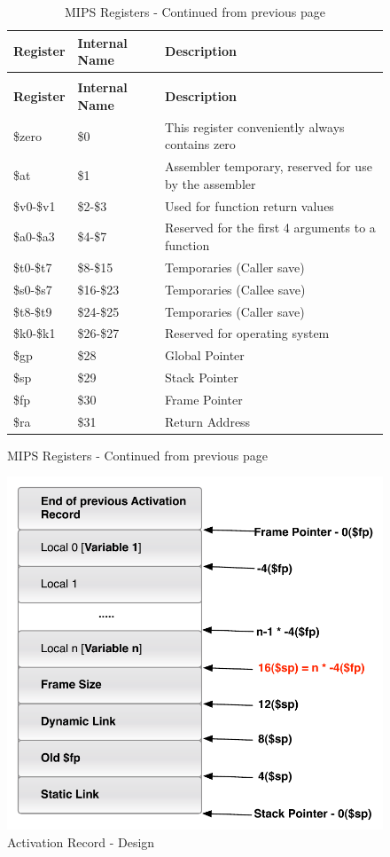 \begin{figure}[p]
	\begin{longtable}{|p{3cm}|p{3cm}|p{9cm}|}
		\caption[]{MIPS Registers \label{table:registers}}\\	
		\hline \textbf{Register} & \textbf{Internal Name} & \textbf{Description} \\ \hline
		\endfirsthead
		\caption[]{MIPS Registers - Continued from previous page}\\	
		\hline \textbf{Register} & \textbf{Internal Name} & \textbf{Description} \\ \hline
		\endhead
		\$zero & \$0 & This register conveniently always contains zero \\ \hline
		\$at & \$1 & Assembler temporary, reserved for use by the assembler \\ \hline	
		\$v0-\$v1 & \$2-\$3 & Used for function return values \\ \hline	
		\$a0-\$a3 & \$4-\$7 & Reserved for the first 4 arguments to a function \\ \hline	
		\$t0-\$t7 & \$8-\$15 & Temporaries (Caller save) \\ \hline	
		\$s0-\$s7 & \$16-\$23 & Temporaries (Callee save) \\ \hline	
		\$t8-\$t9 & \$24-\$25 & Temporaries (Caller save) \\ \hline		
		\$k0-\$k1 & \$26-\$27 & Reserved for operating system \\ \hline			
		\$gp & \$28 & Global Pointer \\ \hline					
		\$sp & \$29 & Stack Pointer \\ \hline					
		\$fp & \$30 & Frame Pointer \\ \hline					
		\$ra & \$31 & Return Address \\ \hline								
	\end{longtable}
\end{figure}

\begin{figure}[p]
	\includegraphics[scale=0.6]{ar-include.pdf}
	\caption{Activation Record - Design}
	\label{fig:AR}
\end{figure}

